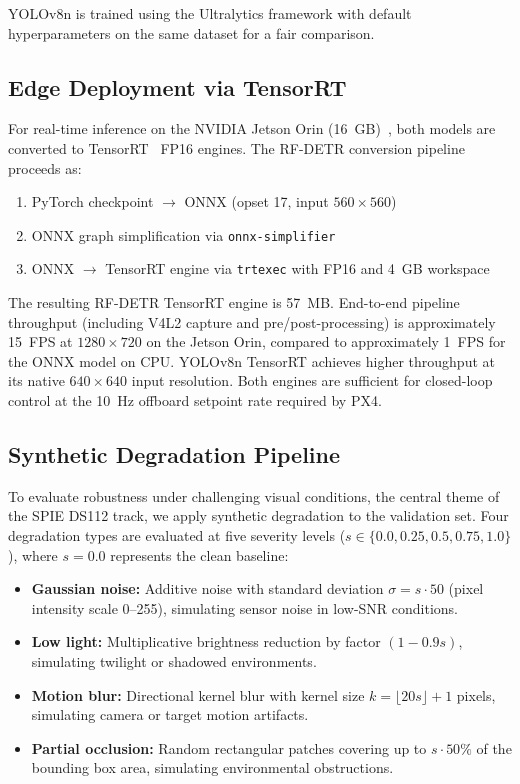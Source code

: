 \documentclass[11pt,letterpaper]{article}
\begin{document}
YOLOv8n is trained using the Ultralytics framework with default hyperparameters on the same dataset for a fair comparison.

\subsection{Edge Deployment via TensorRT}
\label{sec:tensorrt}

For real-time inference on the NVIDIA Jetson Orin (16~GB)~\cite{jetsonorin}, both models are converted to TensorRT~\cite{tensorrt} FP16 engines. The RF-DETR conversion pipeline proceeds as:
%
\begin{enumerate}
    \item PyTorch checkpoint $\rightarrow$ ONNX (opset 17, input $560 \times 560$)
    \item ONNX graph simplification via \texttt{onnx-simplifier}
    \item ONNX $\rightarrow$ TensorRT engine via \texttt{trtexec} with FP16 and 4~GB workspace
\end{enumerate}
%
The resulting RF-DETR TensorRT engine is 57~MB.  End-to-end pipeline throughput (including V4L2 capture and pre/post-processing) is approximately 15~FPS at $1280\times720$ on the Jetson Orin, compared to approximately 1~FPS for the ONNX model on CPU.  YOLOv8n TensorRT achieves higher throughput at its native $640 \times 640$ input resolution.  Both engines are sufficient for closed-loop control at the 10~Hz offboard setpoint rate required by PX4.

\subsection{Synthetic Degradation Pipeline}
\label{sec:degradation_pipeline}

To evaluate robustness under challenging visual conditions, the central theme of the SPIE DS112 track, we apply synthetic degradation to the validation set. Four degradation types are evaluated at five severity levels ($s \in \{0.0, 0.25, 0.5, 0.75, 1.0\}$), where $s = 0.0$ represents the clean baseline:

\begin{itemize}
    \item \textbf{Gaussian noise:} Additive noise with standard deviation $\sigma = s \cdot 50$ (pixel intensity scale 0--255), simulating sensor noise in low-SNR conditions.
    \item \textbf{Low light:} Multiplicative brightness reduction by factor $(1 - 0.9s)$, simulating twilight or shadowed environments.
    \item \textbf{Motion blur:} Directional kernel blur with kernel size $k = \lfloor 20s \rfloor + 1$ pixels, simulating camera or target motion artifacts.
    \item \textbf{Partial occlusion:} Random rectangular patches covering up to $s \cdot 50\%$ of the bounding box area, simulating environmental obstructions.
\end{itemize}
\end{document}
